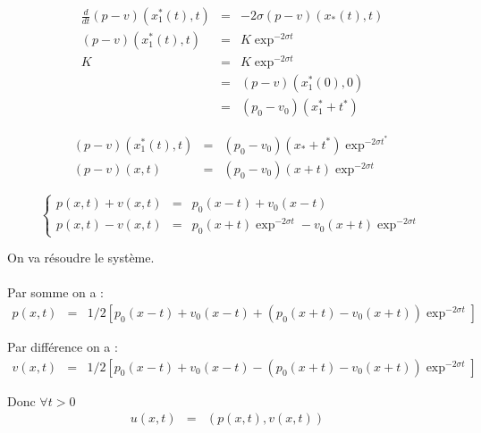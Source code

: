 \documentclass[a4paper,11pt]{article}
\begin{document}
\begin{equation*}
\begin{array}{rcl}
    \frac{d}{dt}(p-v)(x_{1}^{*}(t), t) &=& -2\sigma (p-v)(x_{*}(t), t) \\
    (p-v)(x_{1}^{*}(t), t) &=& K \exp^{-2\sigma t} \\
    K &=& K \exp^{-2\sigma t} \\
    &=& (p-v)(x_{1}^{*}(0), 0) \\
    &=& (p_{0}-v_{0})(x_{1}^{*} + t^{*})
\end{array}
\end{equation*}

\begin{equation*}
\begin{array}{rcl}
    (p-v)(x_{1}^{*}(t), t) &=& (p_{0}-v_{0})(x_{*} + t^{*})\exp^{-2\sigma t^{*}} \\
    (p-v)(x,t) &=& (p_{0}-v_{0})(x+t)\exp^{-2\sigma t}
\end{array}
\end{equation*}

\begin{equation*}
\left\{
\begin{array}{rcl}
    p(x, t) + v(x, t) &=& p_{0}(x - t) + v_{0}(x - t) \\
    p(x, t) - v(x, t) &=& p_{0}(x + t) \exp^{-2\sigma t} - v_{0}(x + t) \exp^{-2\sigma t}
\end{array}
\right.
\end{equation*}

On va résoudre le système. \\ \\
Par somme on a :
\begin{equation*}
\begin{array}{rcll}
    p(x,t) &=& 1/2\left[p_{0}(x - t) + v_{0}(x - t) + (p_{0}(x + t) - v_{0}(x + t))\exp^{-2\sigma t} \right] &
\end{array}
\end{equation*}

Par différence on a : 
\begin{equation*}
\begin{array}{rcll}
    v(x,t) &=& 1/2\left[p_{0}(x - t) + v_{0}(x - t) - (p_{0}(x + t) - v_{0}(x + t))\exp^{-2\sigma t} \right] &
\end{array}
\end{equation*}

Donc \( \forall t > 0 \)
\begin{equation*}
\begin{array}{rcll}
    u(x,t) &=& (p(x,t), v(x,t)) &
\end{array}
\end{equation*}
\end{document}
